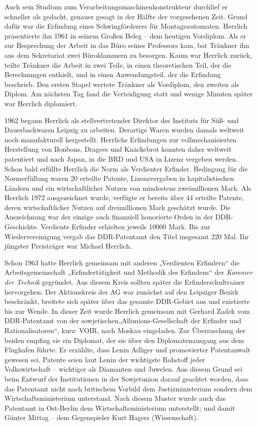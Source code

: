 \documentclass[11pt,a4paper]{article}
\begin{document}
Auch sein Studium zum Verarbeitungsmaschinenkonstrukteur durchlief er
schneller als gedacht, genauer gesagt in der Hälfte der vorgesehenen
Zeit. Grund dafür war die Erfindung eines Schwingförderers für
Montageautomaten. Herrlich präsentierte ihn 1961 in seinem Großen Beleg – dem
heutigen Vordiplom. Als er zur Besprechung der Arbeit in das Büro seines
Professors kam, bat Tränkner ihn aus dem Sekretariat zwei Büroklammern zu
besorgen. Kaum war Herrlich zurück, teilte Tränkner die Arbeit in zwei Teile,
in einen theoretischen Teil, der die Berechnungen enthielt, und in einen
Anwendungsteil, der die Erfindung beschrieb. Den ersten Stapel wertete
Tränkner als Vordiplom, den zweiten als Diplom. Am nächsten Tag fand die
Verteidigung statt und wenige Minuten später war Herrlich diplomiert.

1962 begann Herrlich als stellvertretender Direktor des Instituts für Süß- und
Dauerbackwaren Leipzig zu arbeiten. Derartige Waren wurden damals weltweit
noch manufakturell hergestellt. Herrlichs Erfindungen zur vollmechanisierten
Herstellung von Bonbons, Dragees und Knäckebrot konnten daher weltweit
patentiert und nach Japan, in die BRD und USA in Lizenz vergeben werden. Schon
bald erfüllte Herrlich die Norm als Verdienter Erfinder. Bedingung für die
Normerfüllung waren 20 erteilte Patente, Lizenzvergaben in kapitalistischen
Ländern und ein wirtschaftlicher Nutzen von mindestens zweimillionen Mark. Als
Herrlich 1972 ausgezeichnet wurde, verfügte er bereits über 44 erteilte
Patente, deren wirtschaftlicher Nutzen auf dreimillionen Mark geschätzt
wurde. Die Auszeichnung war der einzige auch finanziell honorierte Orden in
der DDR-Geschichte. Verdiente Erfinder erhielten jeweils 10000 Mark. Bis zur
Wiedervereinigung vergab das DDR-Patentamt den Titel insgesamt 220 Mal. Ihr
jüngster Preisträger war Michael Herrlich.

Schon 1963 hatte Herrlich gemeinsam mit anderen „Verdienten Erfindern“ die
Arbeitsgemeinschaft „Erfindertätigkeit und Methodik des Erfindens“ der
\emph{Kammer der Technik} gegründet. Aus diesem Kreis sollten später die
Erfinderschultrainer hervorgehen.  Der Aktionskreis der AG war zunächst auf
den Leipziger Bezirk beschränkt, breitete sich später über das gesamte
DDR-Gebiet aus und existierte bis zur Wende. In dieser Zeit wurde Herrlich
gemeinsam mit Gerhard Zadek vom DDR-Patentamt von der
sowjetischen„Allunions-Gesellschaft der Erfinder und Rationalisatoren“, kurz:
VOIR, nach Moskau eingeladen. Zur Überraschung der beiden empfing sie ein
Diplomat, der sie über den Diplomatenausgang aus dem Flughafen führte. Er
erzählte, dass Lenin Adliger und promovierter Patentanwalt gewesen
sei. Patente seien laut Lenin der wichtigste Rohstoff jeder Volkswirtschaft –
wichtiger als Diamanten und Juwelen. Aus diesem Grund sei beim Entwurf der
Institutionen in der Sowjetunion darauf geachtet worden, dass das Patentamt
nicht nach britischem Vorbild dem Justizministerium sondern dem
Wirtschaftsministerium unterstand. Nach diesem Muster wurde auch das Patentamt
in Ost-Berlin dem Wirtschaftsministerium unterstellt; und damit Günter Mittag
– dem Gegenspieler Kurt Hagers (Wissenschaft).
\end{document}
